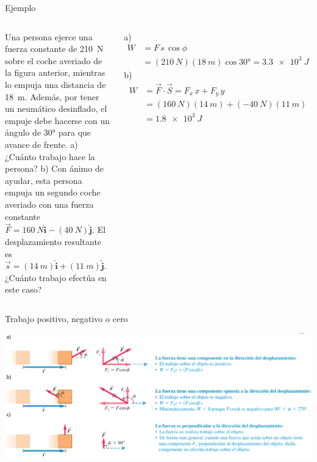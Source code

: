 \documentclass[9pt, aspectratio=169]{beamer}
\begin{document}
\begin{frame}{Ejemplo}
\begin{columns}
\cx 
Una persona ejerce una fuerza constante de \qty{210}{N} sobre el coche averiado de la figura anterior, mientras lo empuja una distancia de \qty{18}{m}. Además, por tener un neumático desinflado, el empuje debe hacerse con un ángulo de \ang{30} para que avance de frente. a) ¿Cuánto trabajo hace la persona? b) Con ánimo de ayudar, esta persona empuja un segundo coche averiado con una fuerza constante $\vec{F} = \qty{160}{N} \hat{\bm{i}} - (\qty{40}{N}) \hat{\bm{j}}$. El desplazamiento resultante es $\vec{s} = (\qty{14}{m}) \hat{\bm{i}} + (\qty{11}{m}) \hat{\bm{j}}$. ¿Cuánto trabajo efectúa en este caso?
\pause

\cx
a) 
\begin{align*}
W &= F \, s\, \cos \phi \\
  &= (\qty{210}{N})(\qty{18}{m}) \cos \ang{30} = \qty{3.3e3}{J}
\end{align*}
\pause
b) 
\begin{align*}
    W &= \vec{F} \cdot \vec{S} = F_x \, x + F_y \, y \\
      &= (\qty{160}{N})(\qty{14}{m}) + (\qty{-40}{N})(\qty{11}{m}) \\
      &= \qty{1.8e3}{J}
\end{align*}
\end{columns}
\end{frame}

\begin{frame}{Trabajo positivo, negativo o cero}
    \begin{center}
        \includegraphics[width=1.0\textwidth]{figs/fig-03.png}
    \end{center}
\end{frame}
\end{document}
